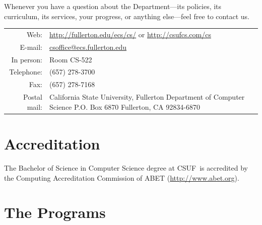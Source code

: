 \documentclass{book}
\newcommand{\CampusName}{CSUF}
\newcommand{\shrunkurl}[1]{\url{http://csufcs.com/#1}}
\begin{document}
Whenever you have a question about the Department---its policies, its curriculum, its services, your progress, or anything else---feel free to contact us.

\begin{tabular}{r p{6in}} %
  Web: & \url{http://fullerton.edu/ecs/cs/} or \shrunkurl{cs} \\ \index{website}
  E-mail: & \href{mailto:csoffice@ecs.fullerton.edu}{\url{csoffice@ecs.fullerton.edu}} \\ \index{e-mail}
  In person: & Room CS-522 \\ \index{department office}
  Telephone: & (657) 278-3700 \\ \index{phone number} \index{telephone number}
  Fax: & (657) 278-7168 \\ \index{fax number}
  Postal mail: & California State University, Fullerton \newline\index{postal address}\index{address}Department of Computer Science \newline
P.O. Box 6870 \newline
Fullerton, CA 92834-6870
\end{tabular}

\section{Accreditation} 

The Bachelor of Science in Computer Science degree at \CampusName~is accredited by the Computing Accreditation Commission of ABET (\url{http://www.abet.org}).

\begin{center}
\end{center}

\section{The Programs}
\end{document}
